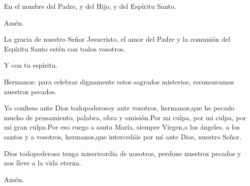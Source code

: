 \indent \pr En el nombre del Padre, y del Hijo, y del Espíritu Santo.

\be Amén.

\pr La gracia de nuestro Señor Jesucristo, el amor del Padre y la comunión del Espíritu Santo estén con todos vosotros.

\be Y con tu espíritu.

\pr Hermanos: para celebrar dignamente estos sagrados misterios, reconozcamos nuestros pecados.

\be Yo confieso ante Dios todopoderoso\redast y ante vosotros, hermanos,\redast que he pecado mucho de pensamiento, palabra, obra y omisión.\redast Por mi culpa, por mi culpa, por mi gran culpa.\redast Por eso ruego a santa María, siempre Virgen,\redast a los ángeles, a los santos y a vosotros, hermanos,\redast que intercedáis por mí ante Dios, nuestro Señor.

\pr Dios todopoderoso tenga misericordia de nosotros, perdone nuestros pecados y nos lleve a la vida eterna.

\be Amén.





